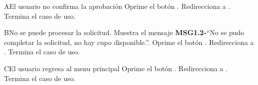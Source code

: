 \begin{UCtrayectoriaA}{A}{El usuario no confirma la aprobación}
	\UCpaso[\UCactor] Oprime el botón .
	\UCpaso Redirecciona a .
	\UCpaso[] Termina el caso de uso.
	\end{UCtrayectoriaA}

\begin{UCtrayectoriaA}{B}{No se puede procesar la solicitud.}
	\UCpaso Muestra el mensaje {\bf MSG1.2-}``No se pudo completar la solicitud, no hay cupo disponible.''.
	\UCpaso[\UCactor] Oprime el botón .
	\UCpaso Redirecciona a .
	\UCpaso[] Termina el caso de uso.
	\end{UCtrayectoriaA}
		
\begin{UCtrayectoriaA}{C}{El usuario regresa al menu principal}
	\UCpaso[\UCactor] Oprime el botón .
	\UCpaso Redirecciona a .
	\UCpaso[] Termina el caso de uso.
	\end{UCtrayectoriaA}
	
